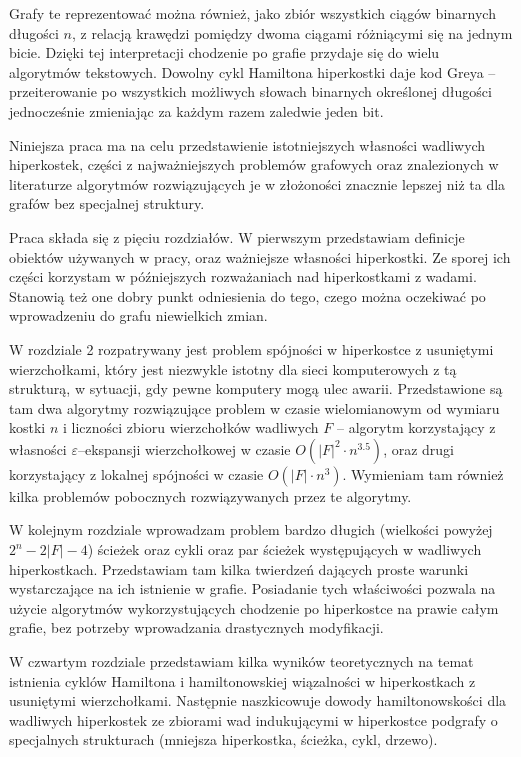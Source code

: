 \documentclass{pracamgr}
\begin{document}
  Grafy te reprezentować można również, jako zbiór wszystkich ciągów binarnych długości $n$,
  z relacją krawędzi pomiędzy dwoma ciągami różniącymi się na jednym bicie.
  Dzięki tej interpretacji chodzenie po grafie przydaje się do wielu algorytmów tekstowych. Dowolny cykl Hamiltona hiperkostki
  daje kod Greya -- przeiterowanie po wszystkich możliwych słowach binarnych określonej długości jednocześnie zmieniając za każdym razem zaledwie jeden
  bit.\newline
  
  Niniejsza praca ma na celu przedstawienie istotniejszych własności wadliwych hiperkostek, części z najważniejszych problemów grafowych
  oraz znalezionych w literaturze algorytmów rozwiązujących je w złożoności znacznie lepszej niż ta dla grafów bez specjalnej struktury.
  
  Praca składa się z pięciu rozdziałów. W pierwszym przedstawiam definicje obiektów używanych w pracy, oraz ważniejsze własności
  hiperkostki. Ze sporej ich części korzystam w późniejszych rozważaniach nad hiperkostkami z wadami.
  Stanowią też one dobry punkt odniesienia do tego, czego można oczekiwać po wprowadzeniu do grafu niewielkich zmian.
  
  W rozdziale 2 rozpatrywany jest problem spójności w hiperkostce z usuniętymi wierzchołkami, który jest niezwykle istotny dla sieci komputerowych
  z tą strukturą, w sytuacji, gdy pewne komputery mogą ulec awarii. Przedstawione są tam dwa algorytmy rozwiązujące problem w czasie wielomianowym od wymiaru kostki $n$
  i liczności zbioru wierzchołków wadliwych $F$ -- algorytm korzystający z własności $\varepsilon$--ekspansji wierzchołkowej w czasie $O(|F|^2\cdot n^{3.5})$,
  oraz drugi korzystający z lokalnej spójności w czasie $O(|F|\cdot n^3)$. Wymieniam tam również kilka problemów pobocznych rozwiązywanych przez te algorytmy.
  
  W kolejnym rozdziale wprowadzam problem bardzo długich (wielkości powyżej $2^n-2|F|-4$) ścieżek oraz cykli oraz par ścieżek występujących w wadliwych hiperkostkach.
  Przedstawiam tam kilka twierdzeń dających proste warunki wystarczające na ich istnienie w grafie.
  Posiadanie tych właściwości pozwala na użycie algorytmów wykorzystujących chodzenie po hiperkostce na prawie całym grafie, bez potrzeby wprowadzania drastycznych modyfikacji.
  
  W czwartym rozdziale przedstawiam kilka wyników teoretycznych na temat istnienia cyklów Hamiltona i hamiltonowskiej wiązalności w hiperkostkach z usuniętymi
  wierzchołkami. Następnie naszkicowuje dowody hamiltonowskości dla wadliwych hiperkostek ze zbiorami wad indukującymi w hiperkostce
  podgrafy o specjalnych strukturach (mniejsza hiperkostka, ścieżka, cykl, drzewo).
  
\end{document}
